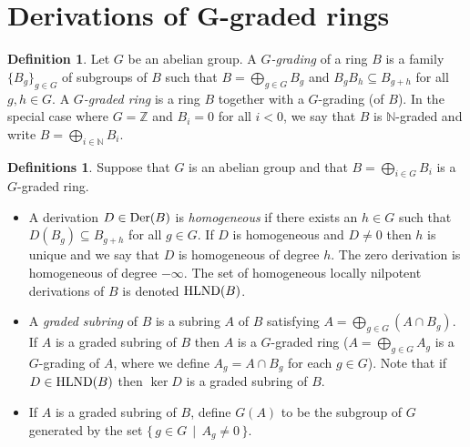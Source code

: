 \documentclass[12pt]{amsart}
\theoremstyle{plain}
\theoremstyle{definition}
\newtheorem{definition}[subsection]{Definition}
\newtheorem{definitions}[subsection]{Definitions}
\newcommand{\Der}{		\operatorname{{\rm Der}}}
\newcommand{\setspec}[2]{\big\{\,#1\, \mid \,#2\, \big\}}
\newcommand{\Integ}{\ensuremath{\mathbb{Z}}}
\newcommand{\Nat}{\ensuremath{\mathbb{N}}}
\newcommand{\hlnd}{\operatorname{{\rm HLND}}}
\begin{document}
\section{Derivations of G-graded rings}

% 
% 
% 

\begin{definition}
Let $G$ be an abelian group.
A \textit{$G$-grading} of a ring $B$ is a family $\{B_g\}_{g \in G}$ of subgroups of $B$ such that
$B = \bigoplus_{g \in G} B_g$
and $B_g B_h \subseteq B_{g+h}$ for all $g, h \in G$.
A \textit{$G$-graded ring} is a ring $B$ together with a $G$-grading (of $B$).
In the special case where $G = \Integ$ and $B_i = 0$ for all $i < 0$,
we say that $B$ is $\Nat$-graded and write $B = \bigoplus_{i \in \Nat} B_i$. 
\end{definition}


\begin{definitions} 
Suppose that $G$ is an abelian group and that  $B = \bigoplus_{i \in G} B_i$ is a $G$-graded ring. 
	
\begin{itemize}
	
	\item A derivation $D \in \Der(B)$ is  \textit{homogeneous} if there exists an $h \in G$ such that $D(B_g) \subseteq B_{g+h}$ for all $g \in G$.
If  $D$ is homogeneous and $D \neq 0$ then $h$ is unique and we say that $D$ is homogeneous of degree $h$.
The zero derivation is homogeneous of degree $-\infty$.
The set of homogeneous locally nilpotent derivations of $B$ is denoted $\hlnd(B)$. 
	
	\item A \textit{graded subring} of $B$ is a subring $A$ of $B$ satisfying  $A = \bigoplus_{g \in G} (A \cap B_g)$.
If $A$ is a graded subring of $B$ then $A$ is a $G$-graded ring
($A = \bigoplus_{g \in G} A_g$ is a $G$-grading of $A$, where we define $A_g = A \cap B_g$ for each $g \in G$).
Note that if $D \in \hlnd(B)$ then $\ker D$ is a graded subring of $B$.
		
	\item If $A$ is a graded subring of $B$, define $G(A)$ to be the subgroup of $G$ generated by the set $\setspec{g \in G}{ A_g \neq 0 }$. 
	
	
	
\end{itemize}
\end{definitions}
\end{document}
